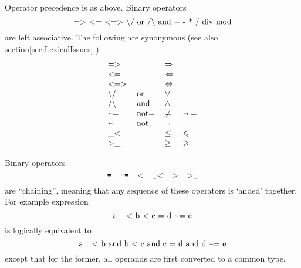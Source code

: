 \documentclass{article}%
\begin{document}
Operator precedence is as above. Binary operators%
\[
\text{\textrm{=%
$>$
$<$%
=
$<$%
=%
$>$
$\backslash$%
/ or /%
$\backslash$
and + - * / div mod}}%
\]
are left associative. The following are synonymous (see also
section\ref{sec:LexicalIssues}
).%
\[%
\begin{tabular}
[c]{llll}%
=%
$>$%
&  & $\Rightarrow$ & \\%
$<$%
= &  & $\Leftarrow$ & \\%
$<$%
=%
$>$%
&  & $\Leftrightarrow$ & \\%
$\backslash$%
/ & or & $\vee$ & \\
/%
$\backslash$%
& and & $\wedge$ & \\
\symbol{126}= & not= & $\neq$ & $\lnot=$\\
\symbol{126} & not & $\lnot$ & \\
\_%
$<$%
&  & $\leq$ & $\leqslant$\\%
$>$%
\_ &  & $\geq$ & $\geqslant$%
\end{tabular}
\]


Binary operators%
\[
\text{\texttt{=\quad\symbol{126}=\quad%
$<$%
\quad\_%
$<$%
\quad%
$>$%
\quad%
$>$%
\_}}%
\]
are \textquotedblleft chaining\textquotedblright, meaning that any sequence of
these operators is `anded' together. For example expression%
\[
\text{a \_%
$<$%
\ b
$<$%
\ c = d \symbol{126}= e}%
\]
is logically equivalent to
\[
\text{a \_%
$<$%
\ b and b
$<$%
\ c and c = d and d \symbol{126}= e}%
\]
except that for the former, all operands are first converted to a common type.
\end{document}
